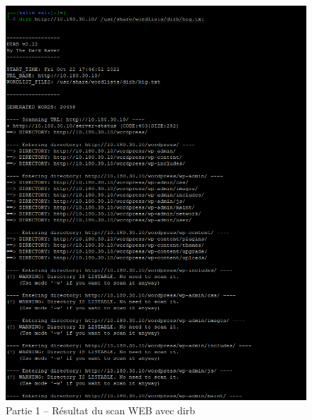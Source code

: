\documentclass[french,paper=a4,oneside,captions=tableheading]{article}
\begin{document}
\begin{figure}[H]
    \centering
    \includegraphics[width=15cm]{images/Secu_Offensive_38.png}
    \caption{Partie 1 -- Résultat du scan WEB avec dirb}
    \label{fig:dirb}
\end{figure}
\end{document}
